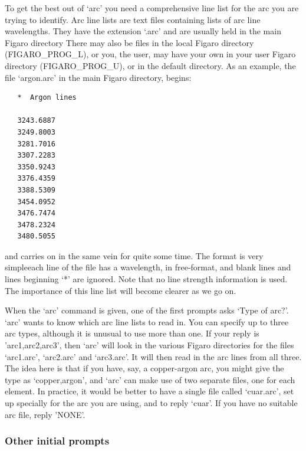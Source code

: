    To get the best out of `arc' you need a comprehensive line list for
   the arc you are trying to identify.  Arc line lists are text files
   containing lists of arc line wavelengths.  They have the extension
   `.arc' and are usually held in the main Figaro directory
   There may also be files in the local Figaro directory (FIGARO\_PROG\_L),
   or you, the user, may have your own in your user Figaro directory
   (FIGARO\_PROG\_U), or in the default directory.  As an example, the file
   `argon.arc' in the main Figaro directory, begins:

\begin{verbatim}
   *  Argon lines

   3243.6887
   3249.8003
   3281.7016
   3307.2283
   3350.9243
   3376.4359
   3388.5309
   3454.0952
   3476.7474
   3478.2324
   3480.5055
\end{verbatim}

   and carries on in the same vein for quite some time.  The format is
   very simple\latorhtm{---}{-}each line of the file has a wavelength, in
   free-format,
   and blank lines and lines beginning `*' are ignored.  Note that no
   line strength information is used. The importance of this line list
   will become clearer as we go on.

   When the `arc' command is given, one of the first prompts asks `Type
   of arc?'.  `arc' wants to know which arc line lists to read in. You
   can specify up to three arc types, although it is unusual to use more
   than one.  If your reply is 'arc1,arc2,arc3', then `arc' will look in
   the various Figaro directories for the files `arc1.arc', `arc2.arc'
   and `arc3.arc'.  It will then read in the arc lines from all three.
   The idea here is that if you have, say, a copper-argon arc, you might
   give the type as `copper,argon', and `arc' can make use of two
   separate files, one for each element.  In practice, it would be
   better to have a single file called `cuar.arc', set up specially for
   the arc you are using, and to reply `cuar'.  If you have no suitable
   arc file, reply 'NONE'.


\subsubsection{\label{techno10initials}Other initial prompts}

